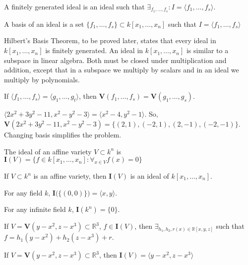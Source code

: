\documentclass[crop=false,class=article,oneside]{standalone}
\begin{document}
    \begin{definition}
    A finitely generated ideal is an ideal such that $\exists_{f_1,\hdots, f_s}: I = \langle f_1,\hdots, f_s\rangle$.
    \end{definition}
    \begin{definition}
    A basis of an ideal is a set $\{f_1,\hdots, f_s\}\subset k[x_1,\hdots ,x_n]$ such that $I=\langle f_{1},\hdots,f_{s}\rangle$
    \end{definition}
    Hilbert's Basis Theorem, to be proved later, states that every ideal in $k[x_{1},\hdots,x_{n}]$ is finitely generated. An ideal in $k[x_{1},\hdots,x_{n}]$ is similar to a subspace in linear algebra. Both must be closed under multiplication and addition, except that in a subspace we multiply by scalars and in an ideal we multiply by polynomials. 
    \begin{theorem}
    If $\langle f_1,\hdots, f_s\rangle = \langle g_1,\hdots, g_t\rangle$, then $\mathbf{V}(f_1,\hdots, f_s) = \mathbf{V}(g_1,\hdots, g_s)$.
    \end{theorem}
    \begin{example}
    $\langle2x^2+3y^2-11,x^2-y^2-3\rangle = \langle x^2-4,y^2-1\rangle$. So, $\mathbf{V}(2x^2+3y^2-11,x^2-y^2-3) = \{(2,1),(-2,1),(2,-1),(-2,-1)\}$. Changing basis simplifies the problem.
    \end{example}
    \begin{definition}
    The ideal of an affine variety $V \subset k^n$ is $\mathbf{I}(V)=\{f\in k[x_1,\hdots ,x_n]:\forall_{x\in V}f(x)=0\}$
    \end{definition}
    \begin{theorem}
    If $V\subset k^n$ is an affine variety, then $\mathbf{I}(V)$ is an ideal of $k[x_1,\hdots ,x_n]$.
    \end{theorem}
    \begin{theorem}
    For any field $k$, $\mathbf{I}\big(\{(0,0)\}\big) = \langle x,y\rangle$.
    \end{theorem}
    \begin{theorem}
    For any infinite field $k$, $\mathbf{I}(k^n) = \{0\}$.
    \end{theorem}
    \begin{theorem}
    If $V = \mathbf{V}(y-x^2,z-x^3)\subset \mathbb{R}^3$, $f\in \mathbf{I}(V)$, then $\exists_{h_1,h_2,r(x)\in \mathbb{R}[x,y,z]}$ such that $f=h_1(y-x^2)+h_2(z-x^3)+r$.
    \end{theorem}
    \begin{theorem}
    If $V = \mathbf{V}(y-x^2,z-x^3)\subset \mathbb{R}^3$, then $\mathbf{I}(V) = \langle y-x^2,z-x^3\rangle$
    \end{theorem}
\end{document}
